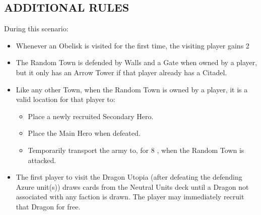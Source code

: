 \begin{multicols}{2}
\subsection*{\MakeUppercase{Additional Rules}}
During this scenario:
\begin{itemize}
  \item Whenever an Obelisk is visited for the first time, the visiting player gains 2 
  \item The Random Town is defended by Walls and a Gate when owned by a player, but it only has an Arrow Tower if that player already has a Citadel.
  \item Like any other Town, when the Random Town is owned by a player, it is a valid location for that player to:
    \begin{itemize}
      \item Place a newly recruited Secondary Hero.
      \item Place the Main Hero when defeated.
      \item Temporarily transport the army to, for 8 , when the Random Town is attacked.
    \end{itemize}
  \item The first player to visit the Dragon Utopia (after defeating the defending Azure unit(s)) draws cards from the Neutral Units  deck until a Dragon not associated with any faction is drawn.
    The player may immediately recruit that Dragon for free.
\end{itemize}

\columnbreak

\phantom{.}
\vfill
\begin{center}
\end{center}
\vfill
\phantom{.}
\end{multicols}


